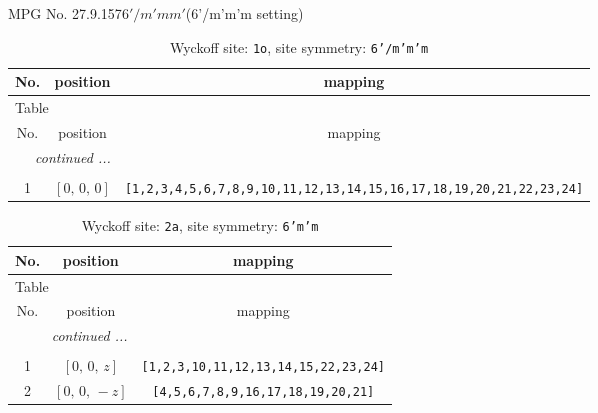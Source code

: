 \documentclass[fleqn,8pt]{jsarticle}
\begin{document}
\setcounter{MaxMatrixCols}{32}

\renewcommand{\tablename}{Table~}
\renewcommand{\figurename}{Figure~}
\begin{center}
\LARGE
MPG No. 27.9.157\quad$6'/m'mm'$\quad(6'/m'm'm setting)
\end{center}
\renewcommand{\arraystretch}{1.2}
\begin{longtable}{ccc}
\caption{Wyckoff site: {\tt 1o}, site symmetry: {\tt 6'/m'm'm}}
 \\
 \hline \hline
No. & position & mapping \\ \hline \endfirsthead

\multicolumn{2}{l}{\tablename\ \thetable{}} \\
 \hline \hline
No. & position & mapping \\ \hline \endhead

 \hline \hline
\multicolumn{2}{r}{\footnotesize\it continued ...} \\ \endfoot

 \hline \hline
\multicolumn{2}{r}{} \\ \endlastfoot

1 & $\left[ 0,\, 0,\, 0 \right]$ & {\tt [1,2,3,4,5,6,7,8,9,10,11,12,13,14,15,16,17,18,19,20,21,22,23,24]} \\
\end{longtable}
\renewcommand{\arraystretch}{1.2}
\begin{longtable}{ccc}
\caption{Wyckoff site: {\tt 2a}, site symmetry: {\tt 6'm'm}}
 \\
 \hline \hline
No. & position & mapping \\ \hline \endfirsthead

\multicolumn{2}{l}{\tablename\ \thetable{}} \\
 \hline \hline
No. & position & mapping \\ \hline \endhead

 \hline \hline
\multicolumn{2}{r}{\footnotesize\it continued ...} \\ \endfoot

 \hline \hline
\multicolumn{2}{r}{} \\ \endlastfoot

1 & $\left[ 0,\, 0,\, z \right]$ & {\tt [1,2,3,10,11,12,13,14,15,22,23,24]} \\ \hline
2 & $\left[ 0,\, 0,\, - z \right]$ & {\tt [4,5,6,7,8,9,16,17,18,19,20,21]} \\
\end{longtable}
\renewcommand{\arraystretch}{1.2}
\end{document}

